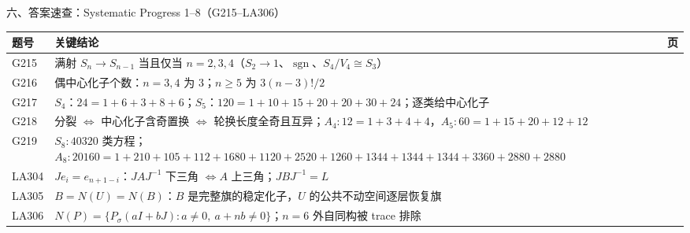 \documentclass[aspectratio=169,10pt,fontset=none]{ctexbeamer}
\begin{document}
\begin{frame}[t]{六、答案速查：Systematic Progress 1--8（G215--LA306）}
  \centering
  \scriptsize
  \setlength{\tabcolsep}{3pt}
  \renewcommand{\arraystretch}{1.18}
  \begin{tabular}{@{}l p{10.0cm} c@{}}
    \toprule
    题号 & 关键结论 & 页\\
    \midrule
    G215 & 满射 $S_n\to S_{n-1}$ 当且仅当 $n=2,3,4$（$S_2\to1$、$\operatorname{sgn}$、$S_4/V_4\cong S_3$） & \pageref{ex:G215}\\
    G216 & 偶中心化子个数：$n=3,4$ 为 $3$；$n\ge5$ 为 $3(n-3)!/2$ & \pageref{ex:G216}\\
    G217 & $S_4$：$24=1+6+3+8+6$；$S_5$：$120=1+10+15+20+20+30+24$；逐类给中心化子 & \pageref{ex:G217}\\
    G218 & 分裂 $\iff$ 中心化子含奇置换 $\iff$ 轮换长度全奇且互异；$A_4:12=1+3+4+4$，$A_5:60=1+15+20+12+12$ & \pageref{ex:G218}\\
    G219 & $S_8:40320$ 类方程；$A_8:20160=1+210+105+112+1680+1120+2520+1260+1344+1344+1344+3360+2880+2880$ & \pageref{ex:G219}\\
    LA304 & $J e_i=e_{n+1-i}$：$JAJ^{-1}$ 下三角 $\iff A$ 上三角；$JBJ^{-1}=L$ & \pageref{ex:LA304}\\
    LA305 & $B=N(U)=N(B)$：$B$ 是完整旗的稳定化子，$U$ 的公共不动空间逐层恢复旗 & \pageref{ex:LA305}\\
    LA306 & $N(P)=\{P_\sigma(aI+bJ):a\ne0,\ a+nb\ne0\}$；$n=6$ 外自同构被 trace 排除 & \pageref{ex:LA306}\\
    \bottomrule
  \end{tabular}
\end{frame}
\end{document}

